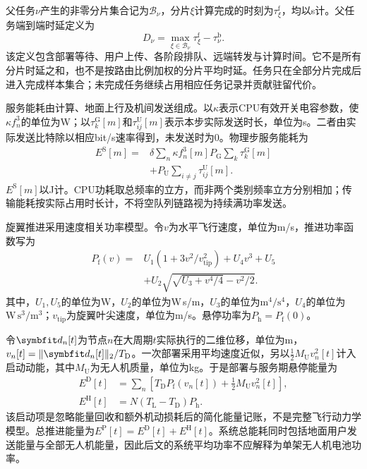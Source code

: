 父任务$\nu$产生的非零分片集合记为$\mathcal B_\nu$，分片$\xi$计算完成的时刻为$\tau_\xi^{\mathrm f}$，均以s计。父任务端到端时延定义为
\begin{equation}
 D_\nu=\max_{\xi\in\mathcal B_\nu}\tau_\xi^{\mathrm f}
 -\tau_\nu^{\mathrm b}.
 \label{eq:parentdelay}
\end{equation}
该定义包含部署等待、用户上传、各阶段排队、远端转发与计算时间。它不是所有分片时延之和，也不是按路由比例加权的分片平均时延。任务只在全部分片完成后进入完成样本集合；未完成任务继续占用相应任务记录并贡献驻留代价。

服务能耗由计算、地面上行及机间发送组成。以$\kappa$表示CPU有效开关电容参数，使$\kappa f_n^3$的单位为W；以$\tau_k^{\mathrm G}[m]$和$\tau_{ij}^{\mathrm U}[m]$表示本步实际发送时长，单位为s。二者由实际发送比特除以相应bit/s速率得到，未发送时为0。物理步服务能耗为
\begin{equation}
 \begin{aligned}
 E^{\mathrm S}[m]={}&
 \delta\sum_n\kappa f_n^3[m]
 P_{\mathrm G}\sum_k\tau_k^{\mathrm G}[m]\\
 &+P_{\mathrm U}\sum_{i\ne j}\tau_{ij}^{\mathrm U}[m].
 \end{aligned}
 \label{eq:serviceenergy}
\end{equation}
$E^{\mathrm S}[m]$以J计。CPU功耗取总频率的立方，而非两个类别频率立方分别相加；传输能耗按实际占用时长计，不将空队列链路视为持续满功率发送。

旋翼推进采用速度相关功率模型\cite{zeng2019}。令$v$为水平飞行速度，单位为m/s，推进功率函数写为
\begin{equation}
 \begin{aligned}
 P_{\mathrm f}(v)={}&U_1(1+3v^2/v_{\mathrm{tip}}^2)+U_4v^3+U_5\\
 &+U_2\sqrt{\sqrt{U_3+v^4/4}-v^2/2}.
 \end{aligned}
 \label{eq:flightpower}
\end{equation}
其中，$U_1,U_5$的单位为W，$U_2$的单位为W\,s/m，$U_3$的单位为$\mathrm{m^4/s^4}$，$U_4$的单位为$\mathrm{W\,s^3/m^3}$；$v_{\mathrm{tip}}$为旋翼叶尖速度，单位为m/s。悬停功率为$P_{\mathrm h}=P_{\mathrm f}(0)$。

令$\vct d_n[t]$为节点$n$在大周期$t$实际执行的二维位移，单位为m，$v_n[t]=\|\vct d_n[t]\|_2/T_{\mathrm D}$。一次部署采用平均速度近似，另以$\frac12M_{\mathrm U}v_n^2[t]$计入启动动能，其中$M_{\mathrm U}$为无人机质量，单位为kg。于是部署与服务期悬停能量为
\begin{equation}
 \begin{aligned}
 E^{\mathrm D}[t]&=\sum_n\left[T_{\mathrm D}P_{\mathrm f}(v_n[t])
 +\tfrac12M_{\mathrm U}v_n^2[t]\right],\\
 E^{\mathrm H}[t]&=N(T_{\mathrm L}-T_{\mathrm D})P_{\mathrm h}.
 \end{aligned}
 \label{eq:propenergy}
\end{equation}
该启动项是忽略能量回收和额外机动损耗后的简化能量记账，不是完整飞行动力学模型。总推进能量为$E^{\mathrm P}[t]=E^{\mathrm D}[t]+E^{\mathrm H}[t]$。系统总能耗同时包括地面用户发送能量与全部无人机能量，因此后文的系统平均功率不应解释为单架无人机电池功率。

